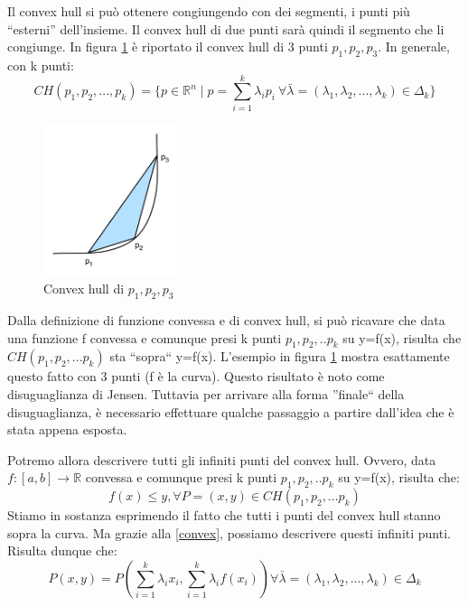 Il convex hull si può ottenere congiungendo con dei segmenti, i punti più ``esterni'' dell'insieme. Il convex hull di due punti sarà 
quindi il segmento che li congiunge. In figura \ref{fig:convexhull} è riportato il convex hull di 3 punti $p_1,p_2,p_3$. In generale, con k punti:
\begin{equation}
 CH(p_1,p_2,...,p_k)=\{ p \in \mathbb{R}^n \mid p=\sum_{i=1}^k \lambda_i p_i \ \forall \bar{\lambda}=(\lambda_1,\lambda_2,...,\lambda_k) 
\in \Delta_k\}
\label{convex}
\end{equation}

\begin{figure}[htbp]
\begin{center}
	\includegraphics[width=0.35\textwidth]{img/convexhull.pdf}
\caption{Convex hull di $p_1,p_2,p_3$}
\label{fig:convexhull}
\end{center}
\end{figure}

Dalla definizione di funzione convessa e di convex hull, si può ricavare che data una funzione f convessa e comunque presi k punti $p_1,p_2,..p_k$ su y=f(x), risulta che $CH(p_1,p_2,...p_k)$ sta ``sopra`` y=f(x). L'esempio in figura \ref{fig:convexhull} mostra esattamente questo fatto con 3 punti (f è la curva).
Questo risultato è noto come disuguaglianza di Jensen. Tuttavia per arrivare alla forma ''finale`` della disuguaglianza, è necessario effettuare qualche passaggio a partire dall'idea che è stata appena esposta.

Potremo allora descrivere tutti gli infiniti punti del convex hull. Ovvero, data $f: [a,b] \to \mathbb{R}$ convessa e comunque presi k punti 
$p_1,p_2,..p_k$ su y=f(x), risulta che:
\[
f(x) \le y, \forall P=(x,y) \in CH(p_1,p_2,...p_k)
\]
Stiamo in sostanza esprimendo il fatto che tutti i punti del convex hull stanno sopra la curva. Ma grazie alla \eqref{convex}, possiamo 
descrivere questi infiniti punti. Risulta dunque che:
\[
 P(x,y)=P \left (\sum_{i=1}^k \lambda_i x_i, \sum_{i=1}^k \lambda_i f(x_i) \right)  
                 \forall \bar{\lambda}=(\lambda_1,\lambda_2,...,\lambda_k) \in \Delta_k
\]

